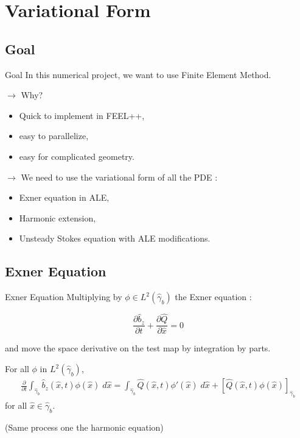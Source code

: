 \section{Variational Form}
\subsection{Goal}

\begin{frame}{Goal}
In this numerical project, we want to use Finite Element Method.

$\rightarrow$ Why?
\begin{itemize}
\item Quick to implement in FEEL++,
\item easy to parallelize,
\item easy for complicated geometry.
\end{itemize}

$\rightarrow$ We need to use the variational form of all the PDE :
\begin{itemize}
\item Exner equation in ALE,
\item Harmonic extension,
\item Unsteady Stokes equation with ALE modifications.
\end{itemize}
\end{frame}



\subsection{Exner Equation}

\begin{frame}{Exner Equation}
Multiplying by $\phi \in L^2 \left( \hat{\gamma}_b \right)$ the Exner equation :

$$\dfrac{\partial \hat{b}_z}{\partial t} + \dfrac{\partial \hat{Q}}{\partial \hat{x}} = 0$$

and move the space derivative on the test map by integration by parts.

For all $\phi$ in $L^2 \left( \hat{\gamma}_b \right)$,
\begin{eqnarray}
  \frac{\partial }{\partial t}
  \int_{\hat{\gamma}_b} \hat{b}_z(\hat{x},t)\phi(\hat{x}) \; d\hat{x}
  =\int_{\hat{\gamma}_b}  \hat{Q}(\hat{x},t) \phi'(\hat{x}) \; d\hat{x}
  +
  \left[  \hat{Q}(\hat{x},t) \phi(\hat{x} )\right]_{\hat{\gamma}_b}
\end{eqnarray}
for all $\hat{x} \in \hat{\gamma}_b$.

(Same process one the harmonic equation)
\end{frame}



